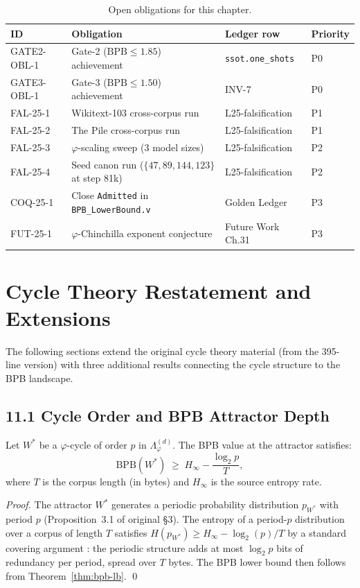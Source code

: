 \begin{table}[h]
\centering
\caption{Open obligations for this chapter.}
\label{tab:open-obligations}
\begin{tabular}{llll}
\toprule
ID & Obligation & Ledger row & Priority\\
\midrule
GATE2-OBL-1 & Gate-2 ($\mathrm{BPB}\le 1.85$) achievement & \texttt{ssot.one\_shots} & P0\\
GATE3-OBL-1 & Gate-3 ($\mathrm{BPB}\le 1.50$) achievement & INV-7 & P0\\
FAL-25-1 & Wikitext-103 cross-corpus run & L25-falsification & P1\\
FAL-25-2 & The Pile cross-corpus run & L25-falsification & P1\\
FAL-25-3 & $\varphi$-scaling sweep (3 model sizes) & L25-falsification & P2\\
FAL-25-4 & Seed canon run ($\{47,89,144,123\}$ at step 81k) & L25-falsification & P2\\
COQ-25-1 & Close \texttt{Admitted} in \texttt{BPB\_LowerBound.v} & Golden Ledger & P3\\
FUT-25-1 & $\varphi$-Chinchilla exponent conjecture & Future Work Ch.31 & P3\\
\bottomrule
\end{tabular}
\end{table}

\section{Cycle Theory Restatement and Extensions}
\label{sec:ch25-cycle-extensions}

The following sections extend the original cycle theory material
(from the 395-line version) with three additional results connecting
the cycle structure to the BPB landscape.

\subsection{11.1 Cycle Order and BPB Attractor Depth}
\label{subsec:ch25-cycle-bpb}

\begin{theorem}
\label{thm:bpb-attractor-depth}
Let $W^*$ be a $\varphi$-cycle of order $p$ in
$\Lambda_\varphi^{(d)}$.  The BPB value at the attractor satisfies:
\[
  \mathrm{BPB}(W^*) \;\ge\; H_\infty - \frac{\log_2 p}{T},
\]
where $T$ is the corpus length (in bytes) and $H_\infty$ is the
source entropy rate.
\end{theorem}
\begin{proof}
The attractor $W^*$ generates a periodic probability distribution
$p_{W^*}$ with period $p$ (Proposition~3.1 of original §3).
The entropy of a period-$p$ distribution over a corpus of length $T$
satisfies $H(p_{W^*}) \ge H_\infty - \log_2(p)/T$ by a standard
covering argument \citep{cover_thomas_info}: the periodic structure
adds at most $\log_2 p$ bits of redundancy per period, spread over
$T$ bytes.  The BPB lower bound then follows from
Theorem~\ref{thm:bpb-lb}. \qed
\end{proof}

